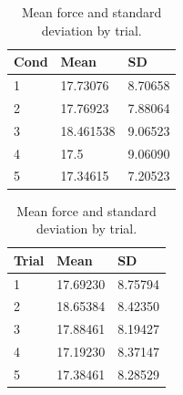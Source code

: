 \begin{table}[H]
 \captionsetup{justification=centering,margin=0.1cm}
 \begin{minipage}{.5\linewidth}
     \centering
\begin{tabular}{|lll|}
\hline
Cond & Mean & SD \\
\hline
1 & 17.73076 & 8.70658\\  
2 &  17.76923 & 7.88064\\ 
3 & 18.461538& 9.06523\\ 
4 & 17.5& 9.06090\\  
5 & 17.34615 &7.20523\\  
\hline
\end{tabular}
\caption{Mean force and standard deviation by condition.}
\end{minipage}\hfill
 \begin{minipage}{.5\linewidth}
 \centering
\begin{tabular}{|lll|}
\hline
Trial & Mean & SD \\
\hline
1 & 17.69230 & 8.75794\\  
2 & 18.65384 & 8.42350\\  
3 & 17.88461 &  8.19427\\  
4 & 17.19230 & 8.37147\\  
5 & 17.38461 & 8.28529\\  
\hline
\end{tabular}
\caption{Mean force and standard deviation by trial.}
\end{minipage}
\end{table} 


